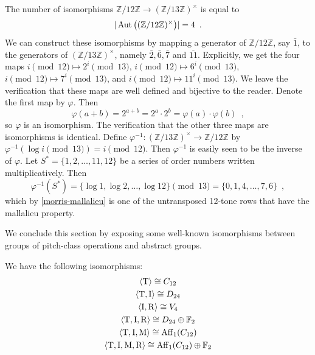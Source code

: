 \begin{example}
	\cite[8]{Lewin1976a}
	\cite[9]{Babbitt1976}
	The number of isomorphisms $\mathbb{Z} / 12 \mathbb{Z} \to (\mathbb{Z} / 13 \mathbb{Z})^\times$ is equal to
	\begin{equation}
		|\operatorname{Aut}\big((\mathbb{Z} / 12 \mathbb{Z})^\times\big)| = 4 \enspace.
	\end{equation}
	We can construct these isomorphisms by mapping a generator of $\mathbb{Z} / 12 \mathbb{Z}$, say $\bar{1}$, to the generators of $(\mathbb{Z} / 13 \mathbb{Z})^\times$, namely $\bar{2}, \bar{6}, \bar{7}$ and $\overline{11}$. Explicitly, we get the four maps $i \pmod{12} \mapsto 2^i \pmod{13}$, $i \pmod{12} \mapsto 6^i \pmod{13}$, $i \pmod{12} \mapsto 7^i \pmod{13}$, and $i \pmod{12} \mapsto 11^i \pmod{13}$. We leave the verification that these maps are well defined and bijective to the reader. Denote the first map by $\varphi$. Then
	\begin{equation}
		\varphi(a + b) = 2^{a + b} = 2^a \cdot 2^b = \varphi(a) \cdot \varphi(b) \enspace,
	\end{equation}
	so $\varphi$ is an isomorphism. The verification that the other three maps are isomorphisms is identical. Define $\varphi^{-1} : (\mathbb{Z} / 13 \mathbb{Z})^\times \to \mathbb{Z} / 12 \mathbb{Z}$ by $\varphi^{-1}(\log i \pmod{13}) = i \pmod{12}$. Then $\varphi^{-1}$ is easily seen to be the inverse of $\varphi$. Let $S^* = \{ 1, 2, \dots, 11, 12 \}$ be a series of order numbers written multiplicatively. Then
	\begin{equation}
		\varphi^{-1}(S^*) = \{ \log 1, \log 2, \dots, \log 12 \} \pmod{13} =
		\{ 0, 1, 4, \dots, 7, 6 \} \enspace,
	\end{equation}
	which by \ref{morris-mallalieu} is one of the untransposed 12-tone rows that have the mallalieu property.
\end{example}

We conclude this section by exposing some well-known isomorphisms between groups of pitch-class operations and abstract groups.

\begin{proposition}
	\cite[127]{FripertingerLackner2015}
	We have the following isomorphisms:
	\begin{gather}
		\langle \operatorname{T} \rangle \cong C_{12} \\
		\langle \operatorname{T}, \operatorname{I} \rangle \cong D_{24} \\
		\langle \operatorname{I}, \operatorname{R} \rangle \cong V_4 \\
		\langle \operatorname{T}, \operatorname{I}, \operatorname{R} \rangle \cong D_{24} \oplus \mathbb{F}_2 \\
		\langle \operatorname{T}, \operatorname{I}, \operatorname{M} \rangle \cong \operatorname{Aff}_1(C_{12}) \\
		\langle \operatorname{T}, \operatorname{I}, \operatorname{M}, \operatorname{R} \rangle \cong \operatorname{Aff}_1(C_{12}) \oplus \mathbb{F}_2
	\end{gather}
\end{proposition}

